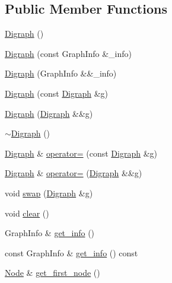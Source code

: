 \subsection*{Public Member Functions}
\begin{DoxyCompactItemize}
\item 
\hyperlink{class_designar_1_1_digraph_ae57ac8513bfcb29602cc08a3d4bc7485}{Digraph} ()
\item 
\hyperlink{class_designar_1_1_digraph_ae5210934b3e6e64caceffee62ff1fcad}{Digraph} (const Graph\+Info \&\+\_\+info)
\item 
\hyperlink{class_designar_1_1_digraph_a534b12da4e0aeb32cff655f05e6c91a4}{Digraph} (Graph\+Info \&\&\+\_\+info)
\item 
\hyperlink{class_designar_1_1_digraph_aa9aa4e8efc114df20a9a10162d43fe40}{Digraph} (const \hyperlink{class_designar_1_1_digraph}{Digraph} \&g)
\item 
\hyperlink{class_designar_1_1_digraph_a109844989cf0ab480ab6fa6f879bf9a9}{Digraph} (\hyperlink{class_designar_1_1_digraph}{Digraph} \&\&g)
\item 
\hyperlink{class_designar_1_1_digraph_aad5e79759f512c213756d22b9ec384bf}{$\sim$\+Digraph} ()
\item 
\hyperlink{class_designar_1_1_digraph}{Digraph} \& \hyperlink{class_designar_1_1_digraph_aa103ce06fd4669e9ced86aa0091ca30c}{operator=} (const \hyperlink{class_designar_1_1_digraph}{Digraph} \&g)
\item 
\hyperlink{class_designar_1_1_digraph}{Digraph} \& \hyperlink{class_designar_1_1_digraph_a49d249b31aade5fff6520aaec60cae78}{operator=} (\hyperlink{class_designar_1_1_digraph}{Digraph} \&\&g)
\item 
void \hyperlink{class_designar_1_1_digraph_a1ee489fd2a20e284a5291943ec2057cb}{swap} (\hyperlink{class_designar_1_1_digraph}{Digraph} \&g)
\item 
void \hyperlink{class_designar_1_1_digraph_a1ec067a8df6129b27e4d79c9c2755899}{clear} ()
\item 
Graph\+Info \& \hyperlink{class_designar_1_1_digraph_a530d2befede0eede246d9eed6c05f1f6}{get\+\_\+info} ()
\item 
const Graph\+Info \& \hyperlink{class_designar_1_1_digraph_a113a9f5a392795312a2d0c0d5c86041c}{get\+\_\+info} () const
\item 
\hyperlink{class_designar_1_1_digraph_a4dc921c41a480b7946a04170e997d8ae}{Node} \& \hyperlink{class_designar_1_1_digraph_a420caa785d93decc7b096de9e51644e7}{get\+\_\+first\+\_\+node} ()
\item 

\end{DoxyCompactItemize}

